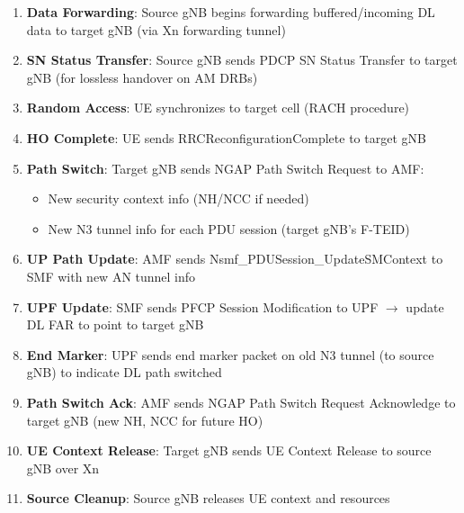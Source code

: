 \begin{enumerate}
  \begin{itemize}
  \tightlist
  \item
    Target cell ID, new C-RNTI
  \item
    Target gNB security algorithm configuration
  \item
    Radio resource configuration for target cell
  \end{itemize}
\item
  \textbf{Data Forwarding}: Source gNB begins forwarding buffered/\allowbreak{}incoming DL data to target gNB (via Xn forwarding tunnel)
\item
  \textbf{SN Status Transfer}: Source gNB sends PDCP SN Status Transfer to target gNB (for lossless handover on AM DRBs)
\item
  \textbf{Random Access}: UE synchronizes to target cell (RACH procedure)
\item
  \textbf{HO Complete}: UE sends RRCReconfigurationComplete to target gNB
\item
  \textbf{Path Switch}: Target gNB sends NGAP Path Switch Request to AMF:

  \begin{itemize}
  \tightlist
  \item
    New security context info (NH/\allowbreak{}NCC if needed)
  \item
    New N3 tunnel info for each PDU session (target gNB’s F-TEID)
  \end{itemize}
\item
  \textbf{UP Path Update}: AMF sends Nsmf\_\allowbreak{}PDUSession\_\allowbreak{}UpdateSMContext to SMF with new AN tunnel info
\item
  \textbf{UPF Update}: SMF sends PFCP Session Modification to UPF \ensuremath{\to} update DL FAR to point to target gNB
\item
  \textbf{End Marker}: UPF sends end marker packet on old N3 tunnel (to source gNB) to indicate DL path switched
\item
  \textbf{Path Switch Ack}: AMF sends NGAP Path Switch Request Acknowledge to target gNB (new NH, NCC for future HO)
\item
  \textbf{UE Context Release}: Target gNB sends UE Context Release to source gNB over Xn
\item
  \textbf{Source Cleanup}: Source gNB releases UE context and resources
\end{enumerate}



